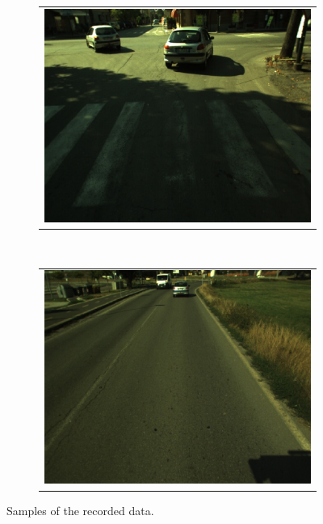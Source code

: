 \begin{figure}[h!]
        \centering
        \begin{subfigure}[b]{0.45\textwidth}
	  \begin{tabular}{c}
	    \includegraphics[width=\textwidth]{intersection}
	  \end{tabular}
	  \caption{}\label{fig:cp03_intersection}
        \end{subfigure}%
        ~
        \begin{subfigure}[b]{0.45\textwidth}
	  \begin{tabular}{c}
	    \includegraphics[width=\textwidth]{motorway}
	  \end{tabular}
	  \caption{}\label{fig:cp03_motorway}
        \end{subfigure}%
        \caption{Samples of the recorded data.}\label{fig:cp03_samples}
\end{figure}

